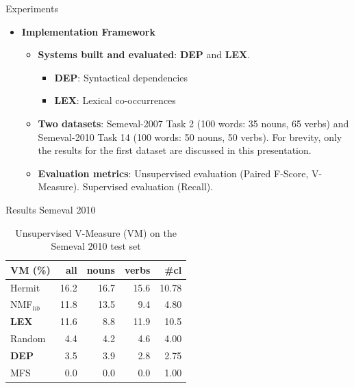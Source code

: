 \begin{frame}{Experiments}
\begin{itemize}
	\item \textbf{Implementation Framework}
	
	\begin{itemize}
	
		\item \textbf{Systems built and evaluated}: \textbf{DEP} and \textbf{LEX}.
		\begin{itemize}
			\item \textbf{DEP}: Syntactical dependencies
			\item \textbf{LEX}: Lexical co-occurrences 
			
		\end{itemize}
	
		\item \textbf{Two datasets}: Semeval-2007 Task 2 (100 words: 35 nouns, 65 verbs) and Semeval-2010 Task 14 (100 words: 50 nouns, 50 verbs). For brevity, only the results for the first dataset are discussed in this presentation.
		\item \textbf{Evaluation metrics}: Unsupervised evaluation (Paired F-Score, V-Measure). Supervised evaluation (Recall).


	\end{itemize}
	

\end{itemize}
\end{frame}

\begin{frame}{Results Semeval 2010}
\begin{table}[]
\centering

\begin{tabular}{@{}lrrrr@{}}
\toprule
\textbf{VM (\%)} & \textbf{all} & \textbf{nouns} & \textbf{verbs} & \textbf{\#cl} \\ \midrule
{Hermit} & 16.2 & 16.7 & 15.6 & 10.78 \\
NMF$_{lib}$&11.8&13.5&9.4&4.80\\
\textbf{LEX} & 11.6 & 8.8 & 11.9 & 10.5 \\
Random & 4.4 & 4.2 & 4.6 & 4.00 \\
\textbf{DEP} & 3.5 & 3.9 & 2.8 & 2.75 \\
MFS & 0.0 & 0.0 & 0.0 & 1.00 \\ \bottomrule
\end{tabular}
\caption{Unsupervised V-Measure (VM) on the Semeval 2010 test set}
\label{tab:sem2010_VM}
\end{table}


\end{frame}

